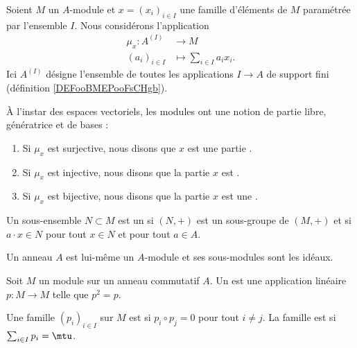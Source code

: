 Soient \( M\) un \( A\)-module et \( x=(x_i)_{i\in I}\) une famille d'éléments de \( M\) paramétrée par l'ensemble \( I\). Nous considérons l'application
\begin{equation}
	\begin{aligned}
		\mu_x\colon A^{(I)} & \to M                        \\
		(a_i)_{i\in I}      & \mapsto \sum_{i\in I}a_ix_i.
	\end{aligned}
\end{equation}
Ici \( A^{(I)}\) désigne l'ensemble de toutes les applications \( I\to A\) de support fini (définition \ref{DEFooBMEPooFsCHgb}).

\begin{definition}      \label{DefBasePouyKj}
	À l'instar des espaces vectoriels, les modules ont une notion de partie libre, génératrice et de bases :
	\begin{enumerate}
		\item
		      Si \( \mu_x\) est surjective, nous disons que \( x\) est une partie .
		\item
		      Si \( \mu_x\) est injective, nous disons que la partie \( x\) est .
		\item
		      Si \( \mu_x\) est bijective, nous disons que la partie \( x\) est une .
	\end{enumerate}
\end{definition}

\begin{definition}
	Un sous-ensemble \( N\subset M\) est un  si \( (N,+)\) est un sous-groupe de \( (M,+)\) et si \( a\cdot x\in N\) pour tout \( x\in N\) et pour tout \( a\in A\).
\end{definition}

\begin{example}
	Un anneau \( A\) est lui-même un \( A\)-module et ses sous-modules sont les idéaux.
\end{example}

\begin{definition}
	Soit \( M\) un module sur un anneau commutatif \( A\). Un  est une application linéaire \( p\colon M\to M\) telle que \( p^2=p\).

	Une famille \( (p_i)_{i\in I}\) sur \( M\) est  si \( p_i\circ p_j=0\) pour tout \( i\neq j\). La famille est  si \( \sum_{i\in I}p_i=\mtu\).
\end{definition}


